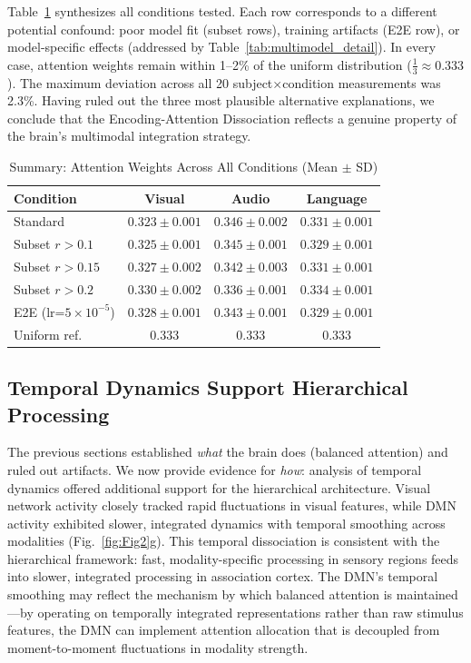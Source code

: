 \documentclass[conference]{IEEEtran}
\begin{document}
Table~\ref{tab:controls_summary} synthesizes all conditions tested. Each row corresponds to a different potential confound: poor model fit (subset rows), training artifacts (E2E row), or model-specific effects (addressed by Table~\ref{tab:multimodel_detail}). In every case, attention weights remain within 1--2\% of the uniform distribution ($\frac{1}{3} \approx 0.333$). The maximum deviation across all 20 subject$\times$condition measurements was 2.3\%. Having ruled out the three most plausible alternative explanations, we conclude that the Encoding-Attention Dissociation reflects a genuine property of the brain's multimodal integration strategy.

\begin{table}[t]
\caption{Summary: Attention Weights Across All Conditions (Mean $\pm$ SD)}
\label{tab:controls_summary}
\centering
\begin{tabular*}{\columnwidth}{@{\extracolsep{\fill}}lccc@{}}
\toprule
Condition & Visual & Audio & Language \\
\midrule
Standard & $0.323 \pm 0.001$ & $0.346 \pm 0.002$ & $0.331 \pm 0.001$ \\
Subset $r\!>\!0.1$ & $0.325 \pm 0.001$ & $0.345 \pm 0.001$ & $0.329 \pm 0.001$ \\
Subset $r\!>\!0.15$ & $0.327 \pm 0.002$ & $0.342 \pm 0.003$ & $0.331 \pm 0.001$ \\
Subset $r\!>\!0.2$ & $0.330 \pm 0.002$ & $0.336 \pm 0.001$ & $0.334 \pm 0.001$ \\
E2E (lr=$5\!\times\!10^{-5}$) & $0.328 \pm 0.001$ & $0.343 \pm 0.001$ & $0.329 \pm 0.001$ \\
\midrule
Uniform ref. & 0.333 & 0.333 & 0.333 \\
\bottomrule
\end{tabular*}
\end{table}

\subsection{Temporal Dynamics Support Hierarchical Processing}

The previous sections established \textit{what} the brain does (balanced attention) and ruled out artifacts. We now provide evidence for \textit{how}: analysis of temporal dynamics offered additional support for the hierarchical architecture. Visual network activity closely tracked rapid fluctuations in visual features, while DMN activity exhibited slower, integrated dynamics with temporal smoothing across modalities (Fig.~\ref{fig:Fig2}g). This temporal dissociation is consistent with the hierarchical framework: fast, modality-specific processing in sensory regions feeds into slower, integrated processing in association cortex. The DMN's temporal smoothing may reflect the mechanism by which balanced attention is maintained---by operating on temporally integrated representations rather than raw stimulus features, the DMN can implement attention allocation that is decoupled from moment-to-moment fluctuations in modality strength.
\end{document}
